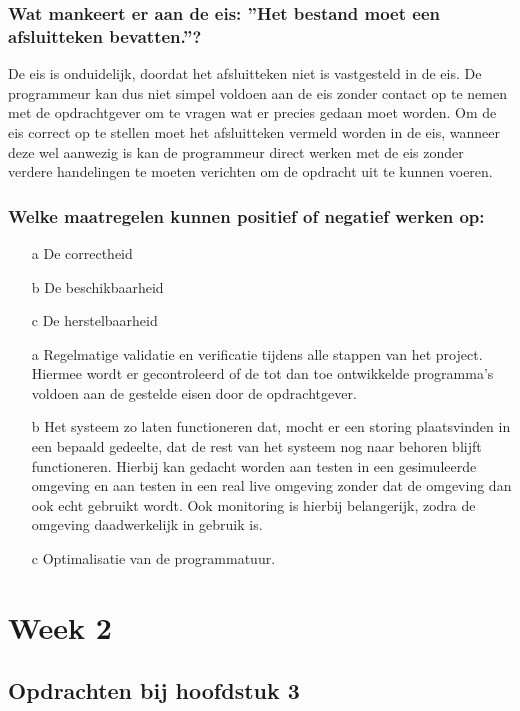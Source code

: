 \documentclass[a4paper,titlepage]{artikel1}
\begin{document}
   \subsubsection[Opdracht 9]{Wat mankeert er aan de eis: ''Het bestand moet een afsluitteken bevatten.''?}
   De eis is onduidelijk, doordat het afsluitteken niet is vastgesteld in de eis. De programmeur kan dus niet simpel voldoen aan de eis zonder contact op te nemen met de opdrachtgever om te vragen wat er precies gedaan moet worden. Om de eis correct op te stellen moet het afsluitteken vermeld worden in de eis, wanneer deze wel aanwezig is kan de programmeur direct werken met de eis zonder verdere handelingen te moeten verichten om de opdracht uit te kunnen voeren.
   
   \subsubsection[Opdracht 10]{Welke maatregelen kunnen positief of negatief werken op:}
   \begin{itemize}
    \item[a] De correctheid
    \item[b] De beschikbaarheid
    \item[c] De herstelbaarheid
   \end{itemize}
   \begin{itemize}
     \item[a] Regelmatige validatie en verificatie tijdens alle stappen van het project. Hiermee wordt er gecontroleerd of de tot dan toe ontwikkelde programma's voldoen aan de gestelde eisen door de opdrachtgever.
     \item[b] Het systeem zo laten functioneren dat, mocht er een storing plaatsvinden in een bepaald gedeelte, dat de rest van het systeem nog naar behoren blijft functioneren. Hierbij kan gedacht worden aan testen in een gesimuleerde omgeving en aan testen in een real live omgeving zonder dat de omgeving dan ook echt gebruikt wordt. Ook monitoring is hierbij belangerijk, zodra de omgeving daadwerkelijk in gebruik is.
     \item[c] Optimalisatie van de programmatuur. 
   \end{itemize}
   
 \section{Week 2}
  \subsection{Opdrachten bij hoofdstuk 3}
\end{document}
